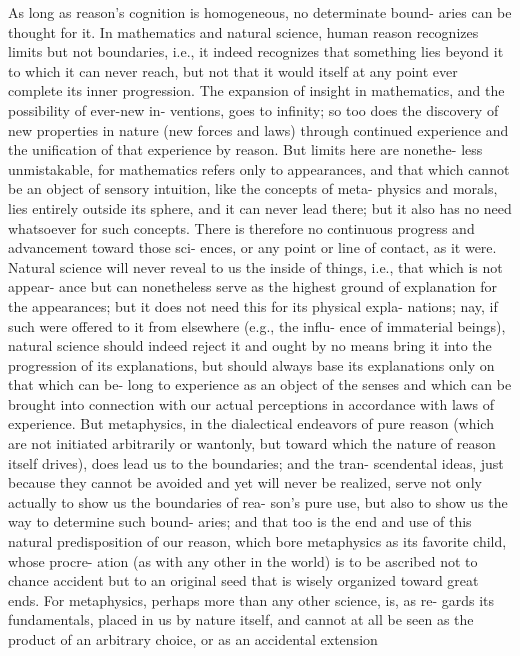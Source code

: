 As long as reason’s cognition is homogeneous, no determinate bound-
aries can be thought for it. In mathematics and natural science, human
reason recognizes limits but not boundaries, i.e., it indeed recognizes
that something lies beyond it to which it can never reach, but not that
it would itself at any point ever complete its inner progression. The
expansion of insight in mathematics, and the possibility of ever-new in-
ventions, goes to inﬁnity; so too does the discovery of new properties
in nature (new forces and laws) through continued experience and the
uniﬁcation of that experience by reason. But limits here are nonethe-
less unmistakable, for mathematics refers only to appearances, and that
which cannot be an object of sensory intuition, like the concepts of meta-
physics and morals, lies entirely outside its sphere, and it can never lead
there; but it also has no need whatsoever for such concepts. There is
therefore no continuous progress and advancement toward those sci-
ences, or any point or line of contact, as it were. Natural science will
never reveal to us the inside of things, i.e., that which is not appear-
ance but can nonetheless serve as the highest ground of explanation
for the appearances; but it does not need this for its physical expla-
nations; nay, if such were offered to it from elsewhere (e.g., the inﬂu-
ence of immaterial beings), natural science should indeed reject it and
ought by no means bring it into the progression of its explanations,
but should always base its explanations only on that which can be-
long to experience as an object of the senses and which can be brought
into connection with our actual perceptions in accordance with laws of
experience.
But metaphysics, in the dialectical endeavors of pure reason (which
are not initiated arbitrarily or wantonly, but toward which the nature
of reason itself drives), does lead us to the boundaries; and the tran-
scendental ideas, just because they cannot be avoided and yet will never
be realized, serve not only actually to show us the boundaries of rea-
son’s pure use, but also to show us the way to determine such bound-
aries; and that too is the end and use of this natural predisposition of
our reason, which bore metaphysics as its favorite child, whose procre-
ation (as with any other in the world) is to be ascribed not to chance
accident but to an original seed that is wisely organized toward great
ends. For metaphysics, perhaps more than any other science, is, as re-
gards its fundamentals, placed in us by nature itself, and cannot at all be
seen as the product of an arbitrary choice, or as an accidental extension
